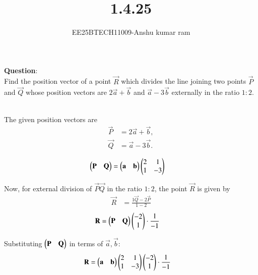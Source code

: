 \documentclass[journal]{IEEEtran}
\begin{document}

\vspace{3cm}

\title{1.4.25}
\author{EE25BTECH11009-Anshu kumar ram}
 \maketitle
{\let\newpage\relax\maketitle}

\renewcommand{\thefigure}{\theenumi}
\renewcommand{\thetable}{\theenumi}
\setlength{\intextsep}{10pt} %


\renewcommand{\thetable}{\theenumi}

\textbf{Question}:\\
Find the position vector of a point $\vec{R}$ which divides the line joining two points $\vec{P}$ and $\vec{Q}$ whose position vectors are $2\vec{a} + \vec{b}$ and $\vec{a} - 3\vec{b}$ externally in the ratio $1:2$.  

\solution \\

The given position vectors are
\begin{align}
    \vec{P} &= 2\vec{a} + \vec{b}, \\
    \vec{Q} &= \vec{a} - 3\vec{b}.
\end{align}


\begin{align}
    \begin{pmatrix}\mathbf{P} & \mathbf{Q}\end{pmatrix}
    &= \begin{pmatrix}\mathbf{a} & \mathbf{b}\end{pmatrix}
       \begin{pmatrix}2 & 1 \\ 1 & -3\end{pmatrix}
\end{align}

Now, for external division of $\vec{P}\vec{Q}$ in the ratio $1:2$,  
the point $\vec{R}$ is given by
\begin{align}
    \vec{R} &= \frac{1\vec{Q} - 2\vec{P}}{1-2}
\end{align}
\begin{align}
    \mathbf{R}
    &= \begin{pmatrix}\mathbf{P} & \mathbf{Q}\end{pmatrix}
       \begin{pmatrix}-2 \\ 1\end{pmatrix} \cdot \frac{1}{-1}
\end{align}

Substituting $\begin{pmatrix}\mathbf{P} & \mathbf{Q}\end{pmatrix}$ in terms of $\vec{a},\vec{b}$:
\begin{align}
    \mathbf{R}
    &= \begin{pmatrix}\mathbf{a} & \mathbf{b}\end{pmatrix}
       \begin{pmatrix}2 & 1 \\ 1 & -3\end{pmatrix}
       \begin{pmatrix}-2 \\ 1\end{pmatrix}\cdot \frac{1}{-1}
\end{align}
\end{document}
